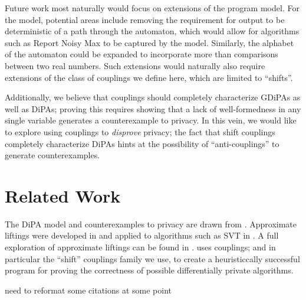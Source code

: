 \documentclass[12pt]{article}
\theoremstyle{definition}
\begin{document}
Future work most naturally would focus on extensions of the program model. For the model, potential areas include removing the requirement for output to be deterministic of a path through the automaton, which would allow for algorithms such as Report Noisy Max to be captured by the model. Similarly, the alphabet of the automaton could be expanded to incorporate more than comparisons between two real numbers. 
Such extensions would naturally also require extensions of the class of couplings we define here, which are limited to ``shifts''. 

Additionally, we believe that couplings should completely characterize GDiPAs as well as DiPAs; proving this requires showing that a lack of well-formedness in any single variable generates a counterexample to privacy. 
In this vein, we would like to explore using couplings to \textit{disprove} privacy; the fact that shift couplings completely characterize DiPAs hints at the possibility of ``anti-couplings'' to generate counterexamples.

\section{Related Work}
The DiPA model and counterexamples to privacy are drawn from \cite{chadhaLinearTimeDecidability2021}. Approximate liftings were developed in \cite{bartheKopfOlmedo2012ProbabilisticRelationalReasoningforDifferentialPriv,BartheOlmedo2013} and applied to algorithms such as SVT in \cite{BartheEtAl2016}.
A full exploration of approximate liftings can be found in \cite{HsuThesis2017}. \cite{AlbarghouthiHsu2018} uses couplings; and in particular the ``shift'' couplings family we use, to create a heuristiccally successful program for proving the correctness of possible differentially private algorithms. 


{\color{red} need to reformat some citations at some point}

\end{document}
